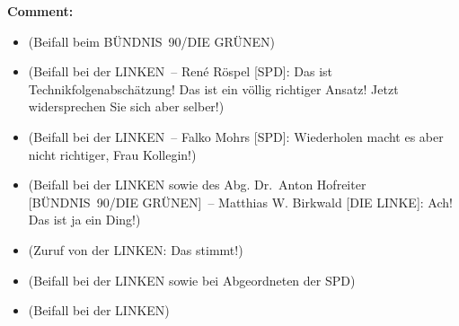 \documentclass{article}
\begin{document}
\noindent\textbf{Comment:}
\begin{itemize}
    \setlength\itemsep{-3pt}
    \item (Beifall beim BÜNDNIS 90/DIE GRÜNEN)
    \setlength\itemsep{-3pt}
    \item (Beifall bei der LINKEN – René Röspel [SPD]: Das ist Technikfolgenabschätzung! Das ist ein völlig richtiger Ansatz! Jetzt widersprechen Sie sich aber selber!)
    \setlength\itemsep{-3pt}
    \item (Beifall bei der LINKEN – Falko Mohrs [SPD]: Wiederholen macht es aber nicht richtiger, Frau Kollegin!)
    \setlength\itemsep{-3pt}
    \item (Beifall bei der LINKEN sowie des Abg. Dr. Anton Hofreiter [BÜNDNIS 90/DIE GRÜNEN] – Matthias W. Birkwald [DIE LINKE]: Ach! Das ist ja ein Ding!)
    \setlength\itemsep{-3pt}
    \item (Zuruf von der LINKEN: Das stimmt!)
    \setlength\itemsep{-3pt}
    \item (Beifall bei der LINKEN sowie bei Abgeordneten der SPD)
    \setlength\itemsep{-3pt}
    \item (Beifall bei der LINKEN)
\end{itemize}
\end{document}
